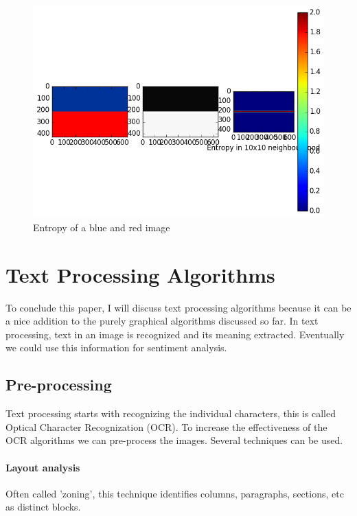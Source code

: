 \documentclass[12pt]{article}
\begin{document}
\begin{figure}[H]
\centering
\includegraphics[scale = 0.54]{img/entropy_blue_red}
\caption{Entropy of a blue and red image}
\label{entropy_blue_red}
\end{figure} 
\newpage

\section{Text Processing Algorithms}

To conclude this paper, I will discuss text processing algorithms because it can be a nice addition to the purely graphical algorithms discussed so far. 
In text processing, text in an image is recognized and its meaning extracted. Eventually we could use this information for sentiment analysis.

\subsection{Pre-processing}

Text processing starts with recognizing the individual characters, this is called Optical Character Recognization (OCR). To increase the effectiveness of the OCR algorithms we can pre-process the images.
Several techniques can be used.

\paragraph{Layout analysis}

Often called 'zoning', this technique identifies columns, paragraphs, sections, etc as distinct blocks.
\end{document}
